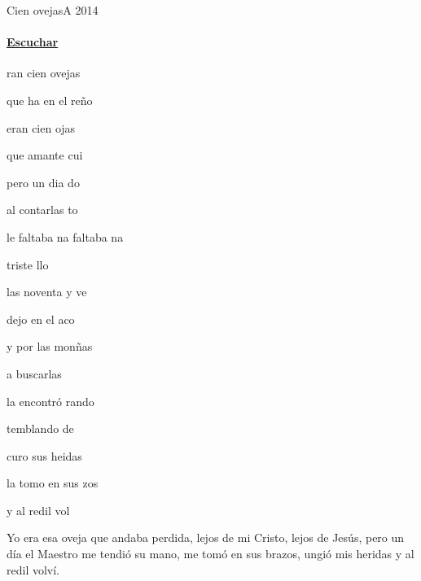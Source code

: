 \documentclass[12pt, spanish]{book}
\begin{document}
    \begin{song}{Cien ovejas}{A}
    {2014} %
    {}
    {} %
    {}
        \ifChordBk
        \paragraph{\mbox{}\hfill\protect\href{https://open.spotify.com/intl-es/track/3OKCoXKuwfH89G2vnumqFL}{Escuchar}\mbox{}\hfill}
        \fi


        \begin{SBOpGroup}
            ran cien ovejas~~

            que ha en el reño

            eran cien ojas

            que amante cui
        \end{SBOpGroup}
        \vskip 20pt
        \begin{SBOpGroup}
            pero un dia do

            al contarlas to

            le faltaba na  faltaba na

             triste llo
        \end{SBOpGroup}

        \begin{SBOpGroup}
            las noventa y ve

            dejo en el aco

            y por las monñas

            a buscarlas 

            la encontró rando 

            temblando de 

            curo sus heidas~

            la tomo en sus zos 

            y al redil vol
        \end{SBOpGroup}

        \begin{SBOpGroup}
            Yo era esa oveja que andaba perdida,
            lejos de mi Cristo, lejos de Jesús,
            pero un día el Maestro me tendió su mano,
            me tomó en sus brazos, ungió mis heridas
            y al redil volví.
        \end{SBOpGroup}


\end{song}
\end{document}

